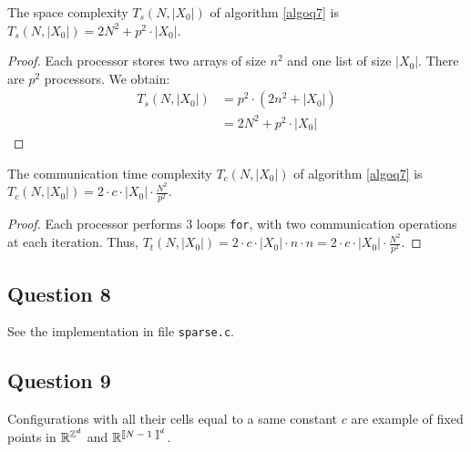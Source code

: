 \begin{prop}
 The space complexity $T_s(N,|X_0|)$ of algorithm \ref{algoq7} is $T_s(N,|X_0|) = 2 N^2 + p^2 \cdot |X_0|$.
\end{prop}

\begin{proof}
 Each processor stores two arrays of size $n^2$ and one list of size $|X_0|$. There are $p^2$ processors. We obtain:
 \[
    \begin{split}
        T_s(N,|X_0|) & = p^2 \cdot (2 n^2 + |X_0|) \\
                     & = 2 N^2 + p^2 \cdot |X_0|
    \end{split}
 \] 
\end{proof}

\begin{prop}
 The communication time complexity $T_c(N,|X_0|)$ of algorithm \ref{algoq7} is $T_c(N,|X_0|) = 2 \cdot c \cdot |X_0| \cdot \frac{N^2}{p^2}$.
\end{prop}

\begin{proof}
 Each processor performs 3 loops \texttt{for}, with two communication operations at each iteration. Thus, $T_t(N,|X_0|) = 2 \cdot c \cdot |X_0| \cdot n \cdot n = 2 \cdot c \cdot |X_0| \cdot \frac{N^2}{p^2}$. 
\end{proof}


\subsection*{Question 8}

See the implementation in file \texttt{sparse.c}.


\subsection*{Question 9}

Configurations with all their cells equal to a same constant $c$ are example of fixed points in $\mathbb{R}^{\mathbb{Z}^d}$ and $\RR^{\text{\textlbrackdbl $N-1$ \textrbrackdbl}^d}$.


